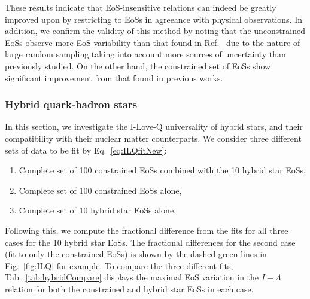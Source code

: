 \documentclass[prd,twocolumn,nofootinbib,superscriptaddress,amsmath,amssymb]{revtex4-1}
\begin{document}
These results indicate that EoS-insensitive relations can indeed be greatly improved upon by restricting to EoSs in agreeance with physical observations.
In addition, we confirm the validity of this method by noting that the unconstrained EoSs observe more EoS variability than that found in Ref.~\cite{Yagi:ILQ} due to the nature of large random sampling taking into account more sources of uncertainty than previously studied.
On the other hand, the constrained set of EoSs show significant improvement from that found in previous works.

\subsubsection{Hybrid quark-hadron stars}\label{sec:ilq-hyb}
In this section, we investigate the I-Love-Q universality of hybrid stars, and their compatibility with their nuclear matter counterparts.
We consider three different sets of data to be fit by Eq.~\ref{eq:ILQfitNew}:
\begin{enumerate}
\item Complete set of 100 constrained EoSs combined with the 10 hybrid star EoSs,
\item Complete set of 100 constrained EoSs alone,
\item Complete set of 10 hybrid star EoSs alone.
\end{enumerate}
Following this, we compute the fractional difference from the fits for all three cases for the 10 hybrid star EoSs.
The fractional differences for the second case (fit to only the constrained EoSs) is shown by the dashed green lines in Fig.~\ref{fig:ILQ} for example.
To compare the three different fits, Tab.~\ref{tab:hybridCompare} displays the maximal EoS variation in the $I-\Lambda$ relation for both the constrained and hybrid star EoSs in each case.
\end{document}
